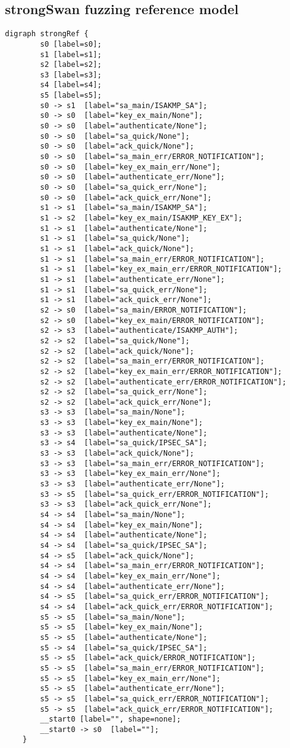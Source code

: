 \begin{appendices}
\subsection*{strongSwan fuzzing reference model}
\begin{lstlisting}[numbers=none]
	digraph strongRef {
		s0 [label=s0];
		s1 [label=s1];
		s2 [label=s2];
		s3 [label=s3];
		s4 [label=s4];
		s5 [label=s5];
		s0 -> s1  [label="sa_main/ISAKMP_SA"];
		s0 -> s0  [label="key_ex_main/None"];
		s0 -> s0  [label="authenticate/None"];
		s0 -> s0  [label="sa_quick/None"];
		s0 -> s0  [label="ack_quick/None"];
		s0 -> s0  [label="sa_main_err/ERROR_NOTIFICATION"];
		s0 -> s0  [label="key_ex_main_err/None"];
		s0 -> s0  [label="authenticate_err/None"];
		s0 -> s0  [label="sa_quick_err/None"];
		s0 -> s0  [label="ack_quick_err/None"];
		s1 -> s1  [label="sa_main/ISAKMP_SA"];
		s1 -> s2  [label="key_ex_main/ISAKMP_KEY_EX"];
		s1 -> s1  [label="authenticate/None"];
		s1 -> s1  [label="sa_quick/None"];
		s1 -> s1  [label="ack_quick/None"];
		s1 -> s1  [label="sa_main_err/ERROR_NOTIFICATION"];
		s1 -> s1  [label="key_ex_main_err/ERROR_NOTIFICATION"];
		s1 -> s1  [label="authenticate_err/None"];
		s1 -> s1  [label="sa_quick_err/None"];
		s1 -> s1  [label="ack_quick_err/None"];
		s2 -> s0  [label="sa_main/ERROR_NOTIFICATION"];
		s2 -> s0  [label="key_ex_main/ERROR_NOTIFICATION"];
		s2 -> s3  [label="authenticate/ISAKMP_AUTH"];
		s2 -> s2  [label="sa_quick/None"];
		s2 -> s2  [label="ack_quick/None"];
		s2 -> s2  [label="sa_main_err/ERROR_NOTIFICATION"];
		s2 -> s2  [label="key_ex_main_err/ERROR_NOTIFICATION"];
		s2 -> s2  [label="authenticate_err/ERROR_NOTIFICATION"];
		s2 -> s2  [label="sa_quick_err/None"];
		s2 -> s2  [label="ack_quick_err/None"];
		s3 -> s3  [label="sa_main/None"];
		s3 -> s3  [label="key_ex_main/None"];
		s3 -> s3  [label="authenticate/None"];
		s3 -> s4  [label="sa_quick/IPSEC_SA"];
		s3 -> s3  [label="ack_quick/None"];
		s3 -> s3  [label="sa_main_err/ERROR_NOTIFICATION"];
		s3 -> s3  [label="key_ex_main_err/None"];
		s3 -> s3  [label="authenticate_err/None"];
		s3 -> s5  [label="sa_quick_err/ERROR_NOTIFICATION"];
		s3 -> s3  [label="ack_quick_err/None"];
		s4 -> s4  [label="sa_main/None"];
		s4 -> s4  [label="key_ex_main/None"];
		s4 -> s4  [label="authenticate/None"];
		s4 -> s4  [label="sa_quick/IPSEC_SA"];
		s4 -> s5  [label="ack_quick/None"];
		s4 -> s4  [label="sa_main_err/ERROR_NOTIFICATION"];
		s4 -> s4  [label="key_ex_main_err/None"];
		s4 -> s4  [label="authenticate_err/None"];
		s4 -> s5  [label="sa_quick_err/ERROR_NOTIFICATION"];
		s4 -> s4  [label="ack_quick_err/ERROR_NOTIFICATION"];
		s5 -> s5  [label="sa_main/None"];
		s5 -> s5  [label="key_ex_main/None"];
		s5 -> s5  [label="authenticate/None"];
		s5 -> s4  [label="sa_quick/IPSEC_SA"];
		s5 -> s5  [label="ack_quick/ERROR_NOTIFICATION"];
		s5 -> s5  [label="sa_main_err/ERROR_NOTIFICATION"];
		s5 -> s5  [label="key_ex_main_err/None"];
		s5 -> s5  [label="authenticate_err/None"];
		s5 -> s5  [label="sa_quick_err/ERROR_NOTIFICATION"];
		s5 -> s5  [label="ack_quick_err/ERROR_NOTIFICATION"];
		__start0 [label="", shape=none];
		__start0 -> s0  [label=""];
	}
\end{lstlisting}
\newpage



\end{appendices}
